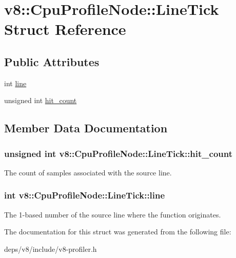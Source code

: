 \hypertarget{structv8_1_1_cpu_profile_node_1_1_line_tick}{}\section{v8\+:\+:Cpu\+Profile\+Node\+:\+:Line\+Tick Struct Reference}
\label{structv8_1_1_cpu_profile_node_1_1_line_tick}
\subsection*{Public Attributes}
\begin{DoxyCompactItemize}
\item 
int \hyperlink{structv8_1_1_cpu_profile_node_1_1_line_tick_af96fbdefbc07b2c84cf41d74555626f6}{line}
\item 
unsigned int \hyperlink{structv8_1_1_cpu_profile_node_1_1_line_tick_a62653fb1e6d381a5747d24b83aab1c1b}{hit\+\_\+count}
\end{DoxyCompactItemize}


\subsection{Member Data Documentation}
\hypertarget{structv8_1_1_cpu_profile_node_1_1_line_tick_a62653fb1e6d381a5747d24b83aab1c1b}{}
\subsubsection[{hit\+\_\+count}]{\setlength{\rightskip}{0pt plus 5cm}unsigned int v8\+::\+Cpu\+Profile\+Node\+::\+Line\+Tick\+::hit\+\_\+count}\label{structv8_1_1_cpu_profile_node_1_1_line_tick_a62653fb1e6d381a5747d24b83aab1c1b}
The count of samples associated with the source line. \hypertarget{structv8_1_1_cpu_profile_node_1_1_line_tick_af96fbdefbc07b2c84cf41d74555626f6}{}
\subsubsection[{line}]{\setlength{\rightskip}{0pt plus 5cm}int v8\+::\+Cpu\+Profile\+Node\+::\+Line\+Tick\+::line}\label{structv8_1_1_cpu_profile_node_1_1_line_tick_af96fbdefbc07b2c84cf41d74555626f6}
The 1-\/based number of the source line where the function originates. 

The documentation for this struct was generated from the following file\+:\begin{DoxyCompactItemize}
\item 
deps/v8/include/v8-\/profiler.\+h\end{DoxyCompactItemize}
